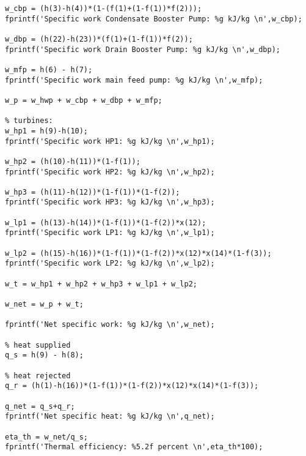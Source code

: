 \begin{fullwidth}
\begin{lstlisting}
w_cbp = (h(3)-h(4))*(1-(f(1)+(1-f(1))*f(2)));
fprintf('Specific work Condensate Booster Pump: %g kJ/kg \n',w_cbp);

w_dbp = (h(22)-h(23))*(f(1)+(1-f(1))*f(2));
fprintf('Specific work Drain Booster Pump: %g kJ/kg \n',w_dbp);

w_mfp = h(6) - h(7);
fprintf('Specific work main feed pump: %g kJ/kg \n',w_mfp);

w_p = w_hwp + w_cbp + w_dbp + w_mfp;

% turbines:
w_hp1 = h(9)-h(10);
fprintf('Specific work HP1: %g kJ/kg \n',w_hp1);

w_hp2 = (h(10)-h(11))*(1-f(1));
fprintf('Specific work HP2: %g kJ/kg \n',w_hp2);

w_hp3 = (h(11)-h(12))*(1-f(1))*(1-f(2));
fprintf('Specific work HP3: %g kJ/kg \n',w_hp3);

w_lp1 = (h(13)-h(14))*(1-f(1))*(1-f(2))*x(12);
fprintf('Specific work LP1: %g kJ/kg \n',w_lp1);

w_lp2 = (h(15)-h(16))*(1-f(1))*(1-f(2))*x(12)*x(14)*(1-f(3));
fprintf('Specific work LP2: %g kJ/kg \n',w_lp2);

w_t = w_hp1 + w_hp2 + w_hp3 + w_lp1 + w_lp2;

w_net = w_p + w_t;

fprintf('Net specific work: %g kJ/kg \n',w_net);

% heat supplied
q_s = h(9) - h(8);

% heat rejected
q_r = (h(1)-h(16))*(1-f(1))*(1-f(2))*x(12)*x(14)*(1-f(3));

q_net = q_s+q_r;
fprintf('Net specific heat: %g kJ/kg \n',q_net);

eta_th = w_net/q_s;
fprintf('Thermal efficiency: %5.2f percent \n',eta_th*100);


\end{lstlisting}
\end{fullwidth}


